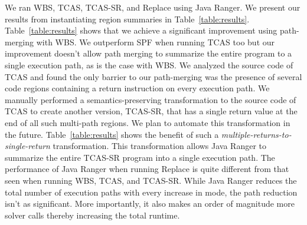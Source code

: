 We ran WBS, TCAS, TCAS-SR, and Replace using Java Ranger.
%
%
%
We present our results from instantiating region summaries in Table~\ref{table:results}.
%
Table~\ref{table:results} shows that we achieve a significant improvement using path-merging with WBS.
%
We outperform SPF when running TCAS too but our improvement doesn't allow path merging to summarize the entire program
to a single execution path, as is the case with WBS.
%
We analyzed the source code of TCAS and found the only barrier to our path-merging was the presence of several code
regions containing a return instruction on every execution path.
%
We manually performed a semantics-preserving transformation to the source code of TCAS to create another version, TCAS-SR,
that has a single return value at the end of all such multi-path regions.
%
We plan to automate this transformation in the future.
%
Table~\ref{table:results} shows the benefit of such a \textit{multiple-returns-to-single-return} transformation.
%
This transformation allows Java Ranger to summarize the entire TCAS-SR program into a single execution path.
%
The performance of Java Ranger when running Replace is quite different from that seen when running WBS, TCAS, and TCAS-SR.
%
While Java Ranger reduces the total number of execution paths with every increase in mode, the path reduction isn't as significant.
%
More importantly, it also makes an order of magnitude more solver calls thereby increasing the total runtime.

